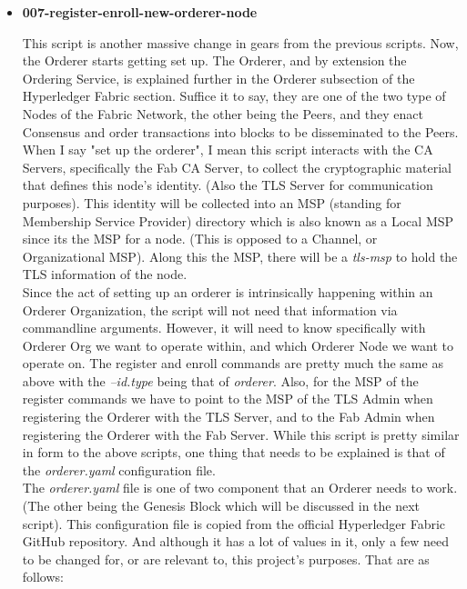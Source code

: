 \begin{itemize}
				\item \textbf{007-register-enroll-new-orderer-node}
				
					\hspace{10mm}This script is another massive change in gears from the previous scripts. Now, the Orderer starts getting set up. The Orderer, and by extension the Ordering Service, is explained further in the Orderer subsection of the Hyperledger Fabric section. Suffice it to say, they are one of the two type of Nodes of the Fabric Network, the other being the Peers, and they enact Consensus and order transactions into blocks to be disseminated to the Peers. When I say "set up the orderer", I mean this script interacts with the CA Servers, specifically the Fab CA Server, to collect the cryptographic material that defines this node's identity. (Also the TLS Server for communication purposes). This identity will be collected into an MSP (standing for Membership Service Provider) directory which is also known as a Local MSP since its the MSP for a node. (This is opposed to a Channel, or Organizational MSP). Along this the MSP, there will be a \textit{tls-msp} to hold the TLS information of the node.\\
					
					\hspace{10mm}Since the act of setting up an orderer is intrinsically happening within an Orderer Organization, the script will not need that information via commandline arguments. However, it will need to know specifically with Orderer Org we want to operate within, and which Orderer Node we want to operate on. The register and enroll commands are pretty much the same as above with the \textit{--id.type} being that of \textit{orderer}. Also, for the MSP of the register commands we have to point to the MSP of the TLS Admin when registering the Orderer with the TLS Server, and to the Fab Admin when registering the Orderer with the Fab Server. While this script is pretty similar in form to the above scripts, one thing that needs to be explained is that of the \textit{orderer.yaml} configuration file.\\
					
					\hspace{10mm}The \textit{orderer.yaml} file is one of two component that an Orderer needs to work. (The other being the Genesis Block which will be discussed in the next script). This configuration file is copied from the official Hyperledger Fabric GitHub repository. And although it has a lot of values in it, only a few need to be changed for, or are relevant to, this project's purposes. That are as follows:
					

\end{itemize}
